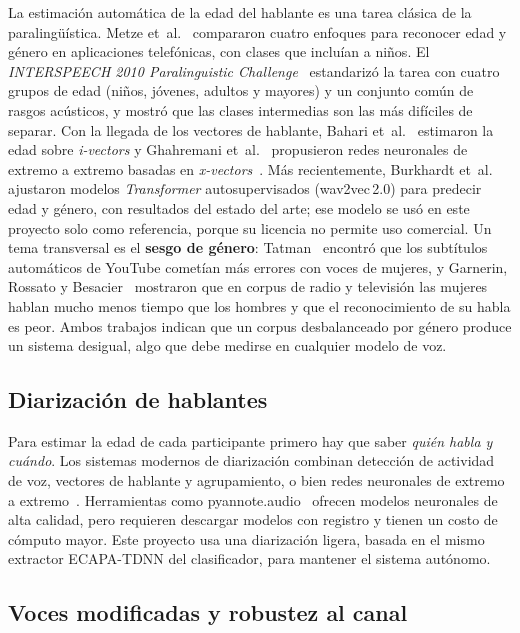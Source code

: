 \documentclass[11pt,a4paper]{article}
\begin{document}
La estimación automática de la edad del hablante es una tarea clásica de la paralingüística. Metze et~al.~\cite{metze2007} compararon cuatro enfoques para reconocer edad y género en aplicaciones telefónicas, con clases que incluían a niños. El \emph{INTERSPEECH 2010 Paralinguistic Challenge}~\cite{schuller2010} estandarizó la tarea con cuatro grupos de edad (niños, jóvenes, adultos y mayores) y un conjunto común de rasgos acústicos, y mostró que las clases intermedias son las más difíciles de separar. Con la llegada de los vectores de hablante, Bahari et~al.~\cite{bahari2014} estimaron la edad sobre \emph{i-vectors} y Ghahremani et~al.~\cite{ghahremani2018} propusieron redes neuronales de extremo a extremo basadas en \emph{x-vectors}~\cite{xvector2018}. Más recientemente, Burkhardt et~al.~\cite{burkhardt2023} ajustaron modelos \emph{Transformer} autosupervisados (wav2vec\,2.0) para predecir edad y género, con resultados del estado del arte; ese modelo se usó en este proyecto solo como referencia, porque su licencia no permite uso comercial. Un tema transversal es el \textbf{sesgo de género}: Tatman~\cite{tatman2017} encontró que los subtítulos automáticos de YouTube cometían más errores con voces de mujeres, y Garnerin, Rossato y Besacier~\cite{garnerin2019} mostraron que en corpus de radio y televisión las mujeres hablan mucho menos tiempo que los hombres y que el reconocimiento de su habla es peor. Ambos trabajos indican que un corpus desbalanceado por género produce un sistema desigual, algo que debe medirse en cualquier modelo de voz.

\subsection{Diarización de hablantes}

Para estimar la edad de cada participante primero hay que saber \emph{quién habla y cuándo}. Los sistemas modernos de diarización combinan detección de actividad de voz, vectores de hablante y agrupamiento, o bien redes neuronales de extremo a extremo~\cite{park2022}. Herramientas como pyannote.audio~\cite{pyannote2020} ofrecen modelos neuronales de alta calidad, pero requieren descargar modelos con registro y tienen un costo de cómputo mayor. Este proyecto usa una diarización ligera, basada en el mismo extractor ECAPA-TDNN del clasificador, para mantener el sistema autónomo.

\subsection{Voces modificadas y robustez al canal}
\end{document}
